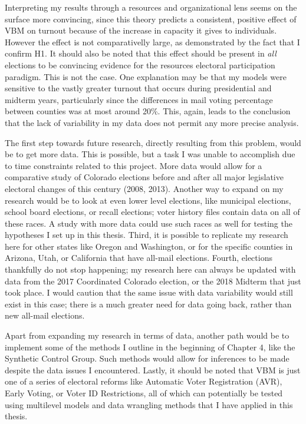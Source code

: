 \documentclass[12pt,twoside]{reedthesis}
\begin{document}
  Interpreting my results through a resources and organizational lens
  seems on the surface more convincing, since this theory predicts a
  consistent, positive effect of VBM on turnout because of the increase in
  capacity it gives to individuals. However the effect is not
  comparativelly large, as demonstrated by the fact that I confirm H1. It
  should also be noted that this effect should be present in \emph{all}
  elections to be convincing evidence for the resources electoral
  participation paradigm. This is not the case. One explanation may be
  that my models were sensitive to the vastly greater turnout that occurs
  during presidential and midterm years, particularly since the
  differences in mail voting percentage between counties was at most
  around 20\%. This, again, leads to the conclusion that the lack of
  variability in my data does not permit any more precise analysis.
  
  The first step towards future research, directly resulting from this
  problem, would be to get more data. This is possible, but a task I was
  unable to accomplish due to time constraints related to this project.
  More data would allow for a comparative study of Colorado elections
  before and after all major legislative electoral changes of this century
  (2008, 2013). Another way to expand on my research would be to look at
  even lower level elections, like municipal elections, school board
  elections, or recall elections; voter history files contain data on all
  of these races. A study with more data could use such races as well for
  testing the hypotheses I set up in this thesis. Third, it is possible to
  replicate my research here for other states like Oregon and Washington,
  or for the specific counties in Arizona, Utah, or California that have
  all-mail elections. Fourth, elections thankfully do not stop happening;
  my research here can always be updated with data from the 2017
  Coordinated Colorado election, or the 2018 Midterm that just took place.
  I would caution that the same issue with data variability would still
  exist in this case; there is a much greater need for data going back,
  rather than new all-mail elections.
  
  Apart from expanding my research in terms of data, another path would be
  to implement some of the methods I outline in the beginning of Chapter
  4, like the Synthetic Control Group. Such methods would allow for
  inferences to be made despite the data issues I encountered. Lastly, it
  should be noted that VBM is just one of a series of electoral reforms
  like Automatic Voter Registration (AVR), Early Voting, or Voter ID
  Restrictions, all of which can potentially be tested using multilevel
  models and data wrangling methods that I have applied in this thesis.
  
\end{document}
